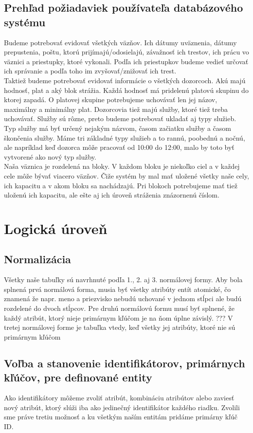 \documentclass[slovak, 12pt, Times New Roman]{article}
\begin{document}
		\subsection{Prehľad požiadaviek používateľa databázového systému}
			Budeme potrebovať evidovať všetkých väzňov. Ich dátumy uväznenia, dátumy prepustenia, poštu, ktorú prijímajú/odosielajú, závažnosť 
			ich trestov, ich prácu vo väznici a priestupky, ktoré vykonali. Podľa ich priestupkov budeme vedieť určovať ich správanie a podľa 
			toho im zvyšovať/znižovať ich trest. \\
			Taktiež budeme potrebovať evidovať informácie o všetkých dozorcoch. Akú majú hodnosť, plat a aký blok strážia. Každá hodnosť má 
			pridelenú platovú skupinu do ktorej zapadá. O platovej skupine potrebujeme uchovávať len jej názov, maximálny a minimálny plat. 
			Dozorcovia tiež majú služby, ktoré tiež treba uchovávať. Služby sú rôzne, preto budeme potrebovať ukladať aj typy služieb. Typ 
			služby má byť určený nejakým názvom, časom začiatku služby a časom škončenia služby. Máme tri základné typy služieb a to rannú, 
			poobednú a nočnú, ale napríklad keď dozorca môže pracovať od 10:00 do 12:00, malo by toto byť vytvorené ako nový typ služby.	\\
			Naša väznica je rozdelená na bloky. V každom bloku je niekoľko ciel a v každej cele môže bývať viacero väzňov. Čiže systém by mal 
			mať uložené všetky naše cely, ich kapacitu a v akom bloku sa nachádzajú. Pri blokoch potrebujeme mať tiež uloženú ich kapacitu, ale 
			ešte aj ich úroveň stráženia znázornenú číslom. 
	\section{Logická úroveň}
		\subsection{Normalizácia}
			Všetky naše tabuľky sú navrhnuté podľa 1., 2. aj 3. normálovej formy. Aby bola splnená prvá normálová forma, musia byť všetky 
			atribúty entít atomické, čo znamená že napr. meno a priezvisko nebudú uchované v jednom stĺpci ale budú rozdelené do dvoch stĺpcov. 
			Pre druhú normálovú formu musí byť splnené, že každý atribút, ktorý nieje primárnym kľúčom je na ňom úplne závislý. ??? V tretej 
			normálovej forme je tabuľka vtedy, keď všetky jej atribúty, ktoré nie sú primárnym kľúčom
		\subsection{Voľba a stanovenie identifikátorov, primárnych kľúčov, pre definované entity}
			Ako identifikátory môžeme zvoliť atribút, kombináciu atribútov alebo zaviesť nový atribút,
			ktorý slúži iba ako jedinečný identifikátor každého riadku. Zvolili sme práve tretiu možnosť a ku všetkým naším entitám pridáme 
			primárny kľúč ID.		
\end{document}
